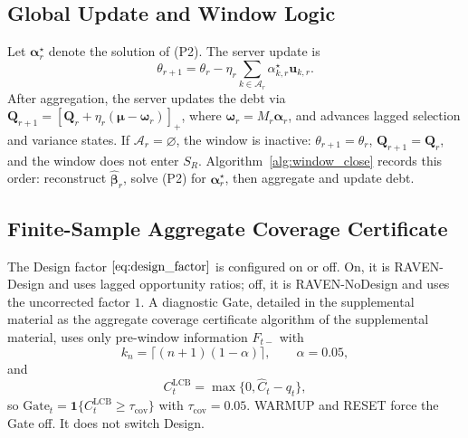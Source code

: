 \documentclass[letterpaper,journal]{IEEEtran}
\begin{document}
\subsection{Global Update and Window Logic}
\label{subsec:global_update}

Let $\boldsymbol\alpha_r^\star$ denote the solution of (P2).  The server update
is
\begin{equation}
 \theta_{r+1}
 =
 \theta_r
 -
 \eta_r
 \sum_{k\in\mathcal{A}_r}
 \alpha^\star_{k,r}\mathbf{u}_{k,r}.
 \label{eq:server_update}
\end{equation}
After aggregation, the server updates the debt via
$\mathbf{Q}_{r+1}=\left[\mathbf{Q}_r+\eta_r(\boldsymbol\mu-\boldsymbol\omega_r)\right]_+$,
where $\boldsymbol\omega_r=M_r\boldsymbol\alpha_r$, and advances lagged
selection and variance states.  If $\mathcal{A}_r=\varnothing$, the
window is inactive: $\theta_{r+1}=\theta_r$, $\mathbf{Q}_{r+1}=\mathbf{Q}_r$,
and the window does not enter $S_R$.  Algorithm~\ref{alg:window_close}
records this order: reconstruct $\widehat{\boldsymbol\beta}_r$, solve (P2) for
$\boldsymbol\alpha_r^\star$, then aggregate and update debt.

\subsection{Finite-Sample Aggregate Coverage Certificate}
\label{subsec:agg_certificate_alg}

The Design factor $\eqref{eq:design_factor}$ is configured on or off.  On, it
is RAVEN-Design and uses lagged opportunity ratios; off, it is RAVEN-NoDesign
and uses the uncorrected factor $1$.  A diagnostic Gate,
detailed in the supplemental material as the aggregate coverage certificate algorithm of the supplemental material,
uses only pre-window information $F_{t-}$ with
\begin{equation}
 k_n=\lceil(n+1)(1-\alpha)\rceil,
 \qquad
 \alpha=0.05,
 \label{eq:agg_kn}
\end{equation}
and
\begin{equation}
 C^{\mathrm{LCB}}_t=\max\{0,\widehat C_t-q_t\},
 \label{eq:agg_CLCB}
\end{equation}
so $\mathrm{Gate}_t=\mathbf{1}\{C^{\mathrm{LCB}}_t\ge\tau_{\mathrm{cov}}\}$ with
$\tau_{\mathrm{cov}}=0.05$.  WARMUP and RESET force the Gate off.  It does
not switch Design.
\end{document}
